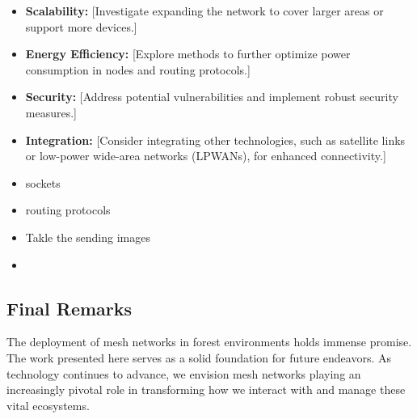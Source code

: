 \begin{itemize}
    \item \textbf{Scalability:} [Investigate expanding the network to cover larger areas or support more devices.]
    \item \textbf{Energy Efficiency:} [Explore methods to further optimize power consumption in nodes and routing protocols.]
    \item \textbf{Security:} [Address potential vulnerabilities and implement robust security measures.]
    \item \textbf{Integration:} [Consider integrating other technologies, such as satellite links or low-power wide-area networks (LPWANs), for enhanced connectivity.]
    \item sockets 
    \item routing protocols
    \item Takle  the sending images 
    \item 
\end{itemize}

\subsection{Final Remarks}

The deployment of mesh networks in forest environments holds immense promise. The work presented here serves as a solid foundation for future endeavors. As technology continues to advance, we envision mesh networks playing an increasingly pivotal role in transforming how we interact with and manage these vital ecosystems. 
